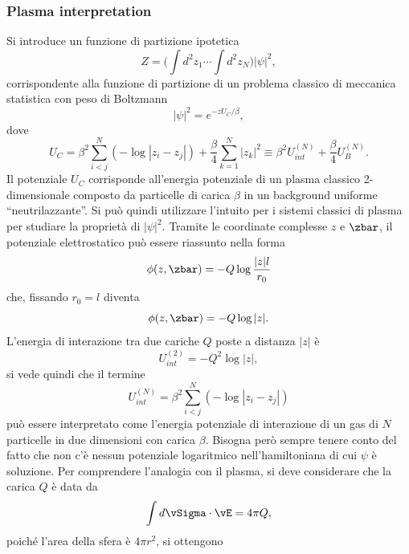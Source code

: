 \subsubsection{Plasma interpretation}
Si introduce un funzione di partizione ipotetica 
\begin{equation}
    Z = \bigg(\int d^2z_1 \cdots \int d^2z_N\bigg)|\psi|^2,
\end{equation}
corrispondente alla funzione di partizione di un problema classico di meccanica statistica con peso di Boltzmann 
\begin{equation}
    |\psi|^2 = e^{-zU_C/\beta},
\end{equation}
dove
\begin{equation}
    U_C = \beta^2\sum_{i < j}^N(-\log{|z_i - z_j|}) + \frac{\beta}{4}\sum_{k=1}^N|z_k|^2 \equiv \beta^2U_{int}^{(N)} + \frac{\beta}{4}U_B^{(N)}.
\end{equation}
Il potenziale $U_C$ corrisponde all'energia potenziale di un plasma classico 2-dimensionale composto da particelle di carica $\beta$ in un background uniforme ``neutrilazzante''. Si può quindi utilizzare l'intuito per i sistemi classici di plasma per studiare la proprietà di $|\psi|^2$. Tramite le coordinate complesse $z$ e $\zbar$, il potenziale elettrostatico può essere riassunto nella forma
\begin{equation}
    \phi(z,\zbar) = -Q\log{\frac{|z|l}{r_0}}
\end{equation}
che, fissando $r_0 = l$ diventa
\begin{equation}
    \phi(z,\zbar) = -Q\log{|z|}.
\end{equation}
L'energia di interazione tra due cariche $Q$ poste a distanza $|z|$ è
\begin{equation}
    U^{(2)}_{int} = -Q^2\log{|z|},
\end{equation}
si vede quindi che il termine 
\begin{equation}
    U^{(N)}_{int} = \beta^2\sum_{i < j}^N(-\log{|z_i - z_j|})
\end{equation}
può essere interpretato come l'energia potenziale di interazione di un gas di $N$ particelle in due dimensioni con carica $\beta$. Bisogna però sempre tenere conto del fatto che non c'è nessun potenziale logaritmico nell'hamiltoniana di cui $\psi$ è soluzione. Per comprendere l'analogia con il plasma, si deve considerare che la carica $Q$ è data da
\begin{equation}
    \int d\vSigma \cdot \vE = 4\pi Q,
\end{equation}
poiché l'area della sfera è $4\pi r^2$, si ottengono
